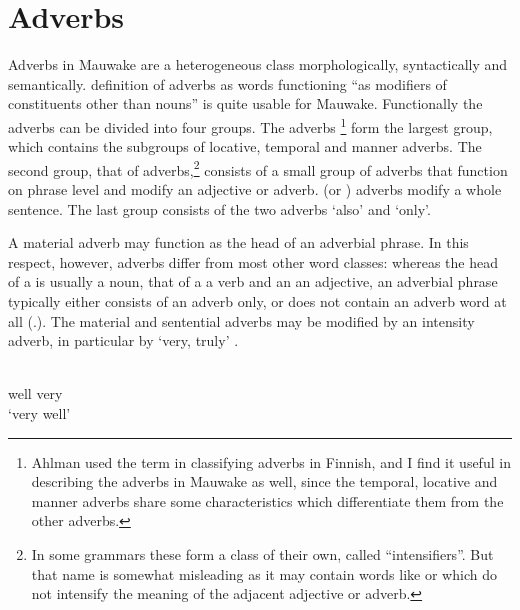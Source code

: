 \section{Adverbs}\label{sec:3:9}
{}
Adverbs in Mauwake are a heterogeneous class morphologically, syntactically and semantically.  definition of adverbs as words functioning ``{as modifiers of constituents other than nouns}'' is quite usable for Mauwake. Functionally the adverbs can be divided into four groups. The  adverbs \citep{Ahlman1933}\footnote{Ahlman used the term in classifying adverbs in Finnish, and I find it useful in describing the adverbs in Mauwake as well, since the temporal, locative and manner adverbs share some characteristics which differentiate them from the other adverbs.} form the largest group, which contains the subgroups of locative, temporal and manner adverbs. The second group, that of  adverbs,\footnote{In some grammars these form a class of their own, called ``intensifiers''. But that name is somewhat misleading as it may contain words like  or  which do not intensify the meaning of the adjacent adjective or adverb.} consists of a small group of adverbs that function on phrase level and modify an adjective or adverb.  (or ) adverbs modify a whole sentence. The last group consists of the two  adverbs  `also' and  `only'.

A material adverb may function as the head of an adverbial phrase. In this respect, however, adverbs differ from most other word classes: whereas the head of a  is usually a noun, that of a  a verb and an  an adjective, an adverbial phrase typically either consists of an adverb only, or does not contain an adverb word at all (.). The material and sentential adverbs may be modified by an intensity adverb, in particular by  `very, truly' .

\ea%
\label{ex:3:x462}
\gll {}  \\
well very\\
\glt`very well'
\z

